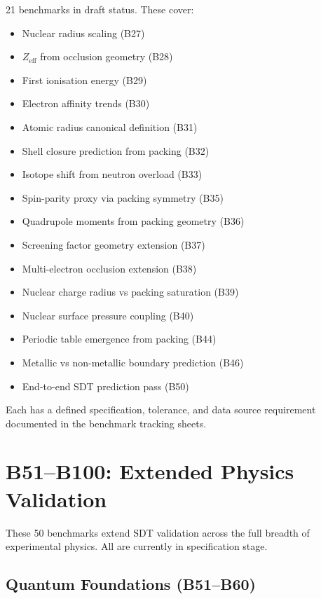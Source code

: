 \documentclass[12pt,a4paper]{report}
\begin{document}
21 benchmarks in draft status. These cover:
\begin{itemize}
  \item Nuclear radius scaling (B27)
  \item $Z_{\text{eff}}$ from occlusion geometry (B28)
  \item First ionisation energy (B29)
  \item Electron affinity trends (B30)
  \item Atomic radius canonical definition (B31)
  \item Shell closure prediction from packing (B32)
  \item Isotope shift from neutron overload (B33)
  \item Spin-parity proxy via packing symmetry (B35)
  \item Quadrupole moments from packing geometry (B36)
  \item Screening factor geometry extension (B37)
  \item Multi-electron occlusion extension (B38)
  \item Nuclear charge radius vs packing saturation (B39)
  \item Nuclear surface pressure coupling (B40)
  \item Periodic table emergence from packing (B44)
  \item Metallic vs non-metallic boundary prediction (B46)
  \item End-to-end SDT prediction pass (B50)
\end{itemize}

Each has a defined specification, tolerance, and data source requirement documented in the benchmark tracking sheets.


\chapter{B51--B100: Extended Physics Validation}
\label{ch:b51-b100}

These 50 benchmarks extend SDT validation across the full breadth of experimental physics. All are currently in specification stage.

\section{Quantum Foundations (B51--B60)}
\end{document}
